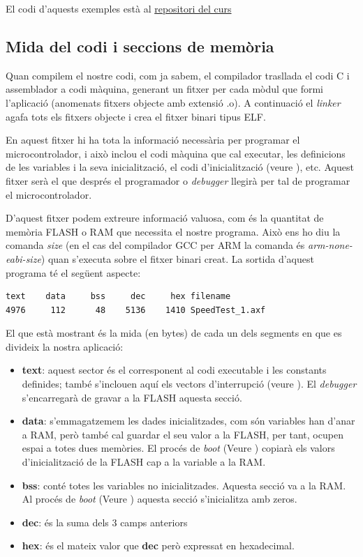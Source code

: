 El codi d'aquests exemples està al \href{https://github.com/mariusmm/cursembedded/tree/master/Simplicity/MemoryMap}{repositori del curs}

\subsection{Mida del codi i seccions de memòria}
\label{sub:size}
Quan compilem el nostre codi, com ja sabem, el compilador trasllada el codi C i assemblador a codi màquina, generant un fitxer per cada mòdul que formi l'aplicació (anomenats fitxers objecte amb extensió .o). A continuació el {\em linker} agafa tots els fitxers objecte i crea el fitxer binari tipus ELF.

En aquest fitxer hi ha tota la informació necessària per programar el microcontrolador, i això inclou el codi màquina que cal executar, les definicions de les variables i la seva inicialització, el codi d'inicialització (veure ), etc. Aquest fitxer serà el que després el programador o {\em debugger} llegirà per tal de programar el microcontrolador.

D'aquest fitxer podem extreure informació valuosa, com és la quantitat de memòria FLASH o RAM que necessita el nostre programa. Això ens ho diu la comanda {\em size} (en el cas del compilador \gls{GCC} per \gls{ARM} la comanda és {\em arm-none-eabi-size}) quan s'executa sobre el fitxer binari creat. La sortida d'aquest programa té el següent aspecte:

\begin{lstlisting}
text    data     bss     dec     hex filename
4976     112      48    5136    1410 SpeedTest_1.axf
\end{lstlisting}

El que està mostrant és la mida (en bytes) de cada un dels segments en que es divideix la nostra aplicació:
\begin{itemize}
 \item {\bf text}: aquest sector és el corresponent al codi executable i les constants definides; també s'inclouen aquí els vectors d'interrupció (veure ). El {\em debugger} s'encarregarà de gravar a la FLASH aquesta secció.
 \item {\bf data}: s'emmagatzemem les dades inicialitzades, com són variables han d'anar a RAM, però també cal guardar el seu valor a la FLASH, per tant, ocupen espai a totes dues memòries. El procés de {\em boot} (Veure ) copiarà els valors d'inicialització de la FLASH cap a la variable a la RAM.
 \item {\bf bss}: conté totes les variables no inicialitzades. Aquesta secció va a la RAM. Al procés de {\em boot} (Veure ) aquesta secció s'inicialitza amb zeros.
 \item {\bf dec}: és la suma dels 3 camps anteriors
 \item {\bf hex}: és el mateix valor que {\bf dec} però expressat en hexadecimal.
\end{itemize}

